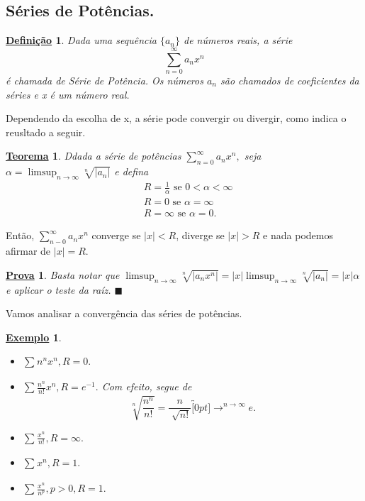 \documentclass{article}
\newtheorem*{def*}{\underline{Defini\c c\~ao}}
\newtheorem*{theorem*}{\underline{Teorema}}
\newtheorem{example}{\underline{Exemplo}}
\newtheorem*{proof*}{\underline{Prova}}
\renewcommand\qedsymbol{$\blacksquare$}
\begin{document}
\subsection{S\'eries de Pot\^encias.}
\begin{def*}
  Dada uma sequ\^encia $\{a_{n}\}$ de n\'umeros reais, a s\'erie 
    $$
      \sum\limits_{n=0}^{\infty}a_{n}x^{n}
    $$
  \'e chamada de S\'erie de Pot\^encia. Os n\'umeros $a_{n}$ s\~ao chamados de coeficientes da s\'eries e x \'e um n\'umero real.
\end{def*}
  Dependendo da escolha de x, a s\'erie pode convergir ou divergir, como indica o reusltado a seguir.
 \begin{theorem*}
   Ddada a s\'erie de pot\^encias $\sum\limits_{n=0}^{\infty}a_{n}x^{n},$ seja $\alpha = \limsup_{n\to\infty}\sqrt[n]{|a_{n}|}$ e defina 
  \begin{align*}
    & R = \frac{1}{\alpha}\text{ se } 0 < \alpha < \infty\\
    & R = 0 \text{ se } \alpha = \infty\\
    & R = \infty \text{ se } \alpha = 0.
  \end{align*}
 \end{theorem*}
 Ent\~ao, $\sum\limits_{n-0}^{\infty}a_{n}x^{n}$ converge se $|x|<R$, diverge se $|x|>R$ e nada podemos afirmar de $|x|=R.$
\begin{proof*}
  Basta notar que $\limsup_{n\to\infty}\sqrt[n]{|a_{n}x^{n}|} = |x|\limsup_{n\to\infty}\sqrt[n]{|a_{n}|} = |x|\alpha$ e aplicar
o teste da ra\'iz. \qedsymbol
\end{proof*}
 Vamos analisar a converg\^encia das s\'eries de pot\^encias.
\begin{example}
 \begin{itemize}
   \item $\sum\limits_{}^{}n^{n}x^{n}, R = 0. $
   \item $\sum\limits_{}^{}\frac{n^{n}}{n!}x^{n}, R = e^{-1}.$ Com efeito, segue de 
     $$
        \sqrt[n]{\frac{n^{n}}{n!}} = \frac{n}{\sqrt[]{n!}}\overbracket[0pt]{\longrightarrow}^{n\to \infty}e.
     $$
    \item $\sum\limits_{}^{}\frac{x^{n}}{n!}, R = \infty.$
    \item $\sum\limits_{}^{}x^{n}, R=1.$
    \item $\sum\limits_{}^{}\frac{x^{n}}{n^{p}}, p > 0, R = 1.$
 \end{itemize}
\end{example}
\end{document}
